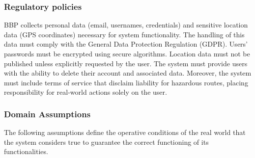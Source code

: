 \subsubsection{Regulatory policies}
BBP collects personal data (email, usernames, credentials) and sensitive location data (GPS coordinates) necessary for system functionality. The handling of this data must comply with the General Data Protection Regulation (GDPR). Users' passwords must be encrypted using secure algorithms. Location data must not be published unless explicitly requested by the user. The system must provide users with the ability to delete their account and associated data. Moreover, the system must include terms of service that disclaim liability for hazardous routes, placing responsibility for real-world actions solely on the user.

\subsubsection{Domain Assumptions}
The following assumptions define the operative conditions of the real world that the system considers true to guarantee the correct functioning of its functionalities.

